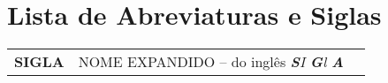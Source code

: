 
\chapter*{Lista de Abreviaturas e Siglas}

\begin{longtable}{lL{14cm}L{\textwidth}}

\textbf{SIGLA}  & NOME EXPANDIDO -- do inglês \textit{\textbf{S}I \textbf{G}l \textbf{A}} & \\


\end{longtable}
